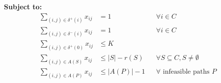 \textbf{Subject to:}
\begin{align}
    \sum_{(i,j)\in \delta^+(i)} x_{ij} & = 1                                                                                  &  & \forall i \in C                         \label{eq:flowout}     \\
    \sum_{(i,j)\in \delta^-(i)} x_{ij} & = 1                                                                                  &  & \forall i \in C                         \label{eq:flowin}      \\
    \sum_{(i,j)\in \delta^+(0)} x_{ij} & \leq K                                                       \label{eq:vehiclelimit}                                                                     \\
    \sum_{(i,j)\in A(S)} x_{ij}        & \leq |S| - r(S)                                                                      &  & \forall S \subseteq C, S \neq \emptyset \label{eq:capacitycut} \\
    \sum_{(i,j)\in A(P)} x_{ij}        & \leq |A(P)| - 1                                                                      &  & \forall \text{ infeasible paths } P     \label{eq:pathelim}
\end{align}



